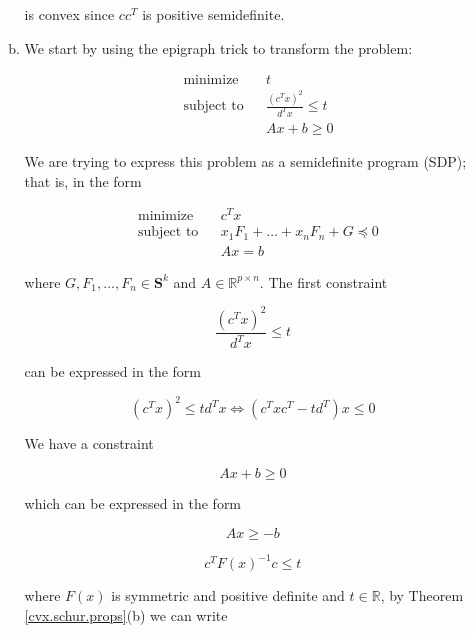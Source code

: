 \begin{enumerate}[(1)]
\begin{enumerate}[(a)]
is convex since \(c c^T\) is positive semidefinite.

%


%

%



\item We start by using the epigraph trick to transform the problem:

\[
\begin{aligned}
& {\text{minimize}}
& & t \\
& \text{subject to}
& & \frac{(c^Tx)^2}{d^Tx} \leq t \\
& & & Ax + b \geq 0
\end{aligned}
\]

We are trying to express this problem as a semidefinite program (SDP); that is, in the form

\[
\begin{aligned}
& {\text{minimize}}
& & c^T x \\
& \text{subject to}
& & x_1F_1 + \ldots + x_n F_n + G \preceq 0 \\
& & & Ax = b
\end{aligned}
\]

where \(G, F_1, \ldots, F_n \in \boldsymbol{S}^k\) and \(A \in \mathbb{R}^{p \times n}\). The first constraint

\[
\frac{(c^Tx)^2}{d^Tx} \leq t
\]

can be expressed in the form

\[
(c^Tx)^2 \leq t d^T x \iff (c^T x c^T - t d^T)x \leq 0
\]


We have a constraint

\[
Ax + b \geq 0
\]

which can be expressed in the form

\[
Ax \geq -b
\]

\[
c^TF(x)^{-1}c  \leq t
\]

where \(F(x)\) is symmetric and positive definite and \(t \in \mathbb{R}\), by Theorem \ref{cvx.schur.props}(b) we can write


\end{enumerate}
\end{enumerate}
